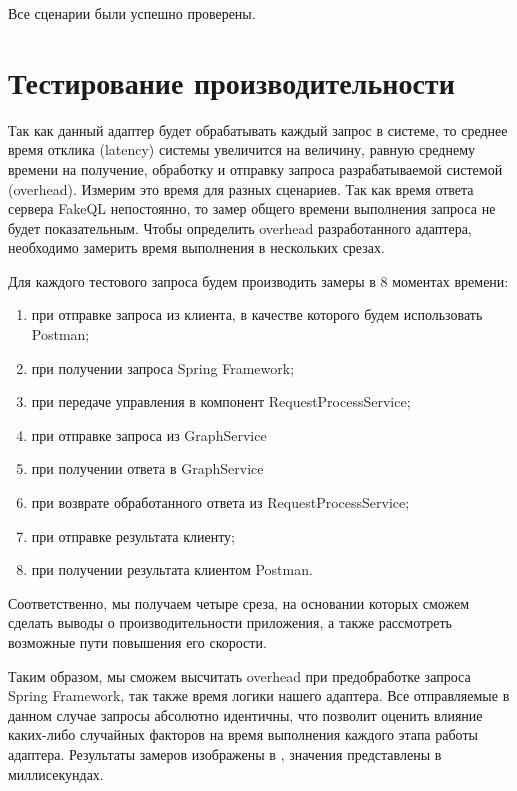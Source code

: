 Все сценарии были успешно проверены.

\section{Тестирование производительности} \label{sec:ch4-performance}

Так как данный адаптер будет обрабатывать каждый запрос в системе, то среднее время отклика (latency) системы увеличится на величину, равную среднему времени на получение, обработку и отправку запроса разрабатываемой системой (overhead).
Измерим это время для разных сценариев.
Так как время ответа сервера FakeQL непостоянно, то замер общего времени выполнения запроса не будет показательным.
Чтобы определить overhead разработанного адаптера, необходимо замерить время выполнения в нескольких срезах.

Для каждого тестового запроса будем производить замеры в 8 моментах времени:
\begin{enumerate}
	\item при отправке запроса из клиента, в качестве которого будем использовать Postman;
	\item при получении запроса Spring Framework;
	\item при передаче управления в компонент RequestProcessService;
	\item при отправке запроса из GraphService
	\item при получении ответа в GraphService
	\item при возврате обработанного ответа из RequestProcessService;
	\item при отправке результата клиенту;
	\item при получении результата клиентом Postman.
\end{enumerate}
Соответственно, мы получаем четыре среза, на основании которых сможем сделать выводы о производительности приложения, а также рассмотреть возможные пути повышения его скорости.

Таким образом, мы сможем высчитать overhead при предобработке запроса Spring Framework, так также время логики нашего адаптера.
Все отправляемые в данном случае запросы абсолютно идентичны, что позволит оценить влияние каких-либо случайных факторов на время выполнения каждого этапа работы адаптера.
Результаты замеров изображены в , значения представлены в миллисекундах.


